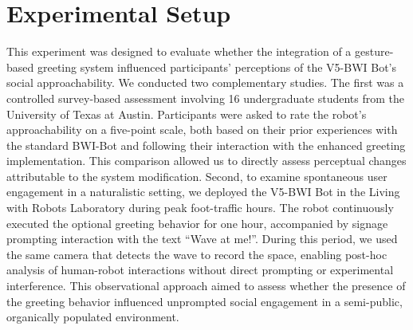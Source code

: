 \documentclass[conference]{IEEEtran}
\begin{document}
\section{Experimental Setup}
This experiment was designed to evaluate whether the integration of a gesture-based greeting system influenced participants' perceptions of the V5-BWI Bot’s social approachability. We conducted two complementary studies. The first was a controlled survey-based assessment involving 16 undergraduate students from the University of Texas at Austin. Participants were asked to rate the robot’s approachability on a five-point scale, both based on their prior experiences with the standard BWI-Bot and following their interaction with the enhanced greeting implementation. This comparison allowed us to directly assess perceptual changes attributable to the system modification. Second, to examine spontaneous user engagement in a naturalistic setting, we deployed the V5-BWI Bot in the Living with Robots Laboratory during peak foot-traffic hours. The robot continuously executed the optional greeting behavior for one hour, accompanied by signage prompting interaction with the text “Wave at me!”. During this period, we used the same camera that detects the wave to record the space, enabling post-hoc analysis of human-robot interactions without direct prompting or experimental interference. This observational approach aimed to assess whether the presence of the greeting behavior influenced unprompted social engagement in a semi-public, organically populated environment. 
\end{document}
